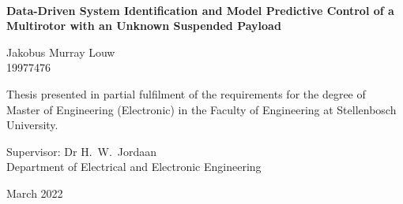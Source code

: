 \graphicspath{{frontmatter/fig/}}

\begin{titlepage}
	\begin{center}
		
		
		
		~\vspace{-2em}
		
		{\sffamily \bfseries \huge Data-Driven System Identification and Model Predictive Control of a Multirotor with an Unknown Suspended Payload \par}
		
		\vspace{4em}
		
		{\large {\Large  Jakobus Murray Louw} \\ 19977476 \par}
		
		\vspace{8em}
		
		{\large Thesis presented in partial fulfilment of the requirements for the degree of \\ Master of Engineering (Electronic) in the Faculty of Engineering at Stellenbosch University. \par}
		
		\vfill
		
		{\large {Supervisor}: Dr H.\ W.\ Jordaan\\
		Department of Electrical and Electronic Engineering \par}
		
		\vspace{10em}
		
		{\Large March 2022}
	\end{center}
\end{titlepage}
